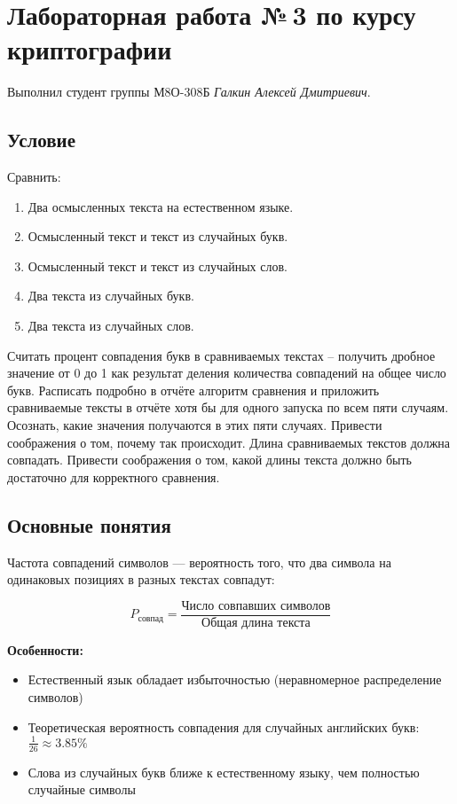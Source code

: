 \documentclass[12pt]{article}
\begin{document}
\section*{Лабораторная работа №\,3 по курсу криптографии}

Выполнил студент группы М8О-308Б \textit{Галкин Алексей Дмитриевич}.

\subsection*{Условие}
Сравнить:
\begin{enumerate}
\item Два осмысленных текста на естественном языке.
\item Осмысленный текст и текст из случайных букв.
\item Осмысленный текст и текст из случайных слов.
\item Два текста из случайных букв.
\item Два текста из случайных слов.
\end{enumerate}

Считать процент совпадения букв в сравниваемых текстах – получить дробное значение от 0 до 1 как результат деления количества совпадений на общее число букв. Расписать подробно в отчёте алгоритм сравнения и приложить сравниваемые тексты в отчёте хотя бы для одного запуска по всем пяти случаям. Осознать, какие значения получаются в этих пяти случаях. Привести соображения о том, почему так происходит. Длина сравниваемых текстов должна совпадать. Привести соображения о том, какой длины текста должно быть достаточно для корректного сравнения.


\subsection{Основные понятия}

Частота совпадений символов — вероятность того, что два символа на одинаковых позициях в разных текстах совпадут:

\begin{equation}
    P_{\text{совпад}} = \frac{\text{Число совпавших символов}}{\text{Общая длина текста}}
\end{equation}

\textbf{Особенности:}
\begin{itemize}
    \item Естественный язык обладает избыточностью (неравномерное распределение символов)
    \item Теоретическая вероятность совпадения для случайных английских букв: $\frac{1}{26} \approx 3.85\%$
    \item Слова из случайных букв ближе к естественному языку, чем полностью случайные символы
\end{itemize}
\end{document}
